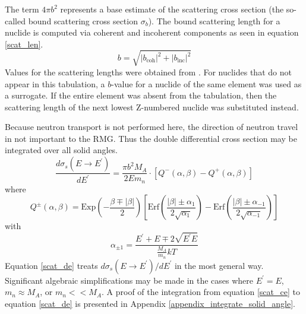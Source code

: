 The term $4 \pi b^2$ represents a base estimate of the scattering cross section
(the so-called bound scattering cross section $\sigma_b$).  
The bound scattering length for a nuclide is computed via coherent and incoherent components
as seen in equation \ref{scat_len}.
\begin{equation}
\label{scat_len}
b = \sqrt{\left| b_{\mbox{coh}} \right|^2 + \left| b_{\mbox{inc}} \right|^2}
\end{equation}
Values for the scattering lengths were obtained from \cite{Sears1992}.  For nuclides
that do not appear in this tabulation, a $b$-value for a nuclide of the same element was
used as a surrogate.  If the entire element was absent from the tabulation, then the 
scattering length of the next lowest Z-numbered nuclide was substituted instead.

Because neutron transport is not performed here, the direction of neutron travel in not
important to the RMG. Thus the double differential cross section may be integrated over all solid angles.
\begin{equation}
\label{scat_de}
\frac{d\sigma_s(E\to E^\prime)}{dE^\prime} = \frac{\pi b^2 M_A}{2Em_n} \cdot 
            \left[Q^-(\alpha, \beta) - Q^+(\alpha, \beta)\right]
\end{equation}
where 
\begin{equation}
\label{scat_q}
Q^\pm(\alpha, \beta) = \mbox{Exp}\left(-\frac{\beta \mp |\beta|}{2}\right) 
                       \left[\mbox{Erf}\left(\frac{|\beta| \pm \alpha_1}{2\sqrt{\alpha_1}}\right) - 
                             \mbox{Erf}\left(\frac{|\beta| \pm \alpha_{-1}}{2\sqrt{\alpha_{-1}}}\right)\right]
\end{equation}
with 
\begin{equation}
\label{scat_alpha_pm}
\alpha_{\pm 1} = \frac{E^\prime + E \mp 2\sqrt{E^\prime E}}{\frac{M_A}{m_n}kT}
\end{equation}
Equation \ref{scat_de} treats $d\sigma_s(E\to E^\prime)/dE^\prime$ in the most general way.  
Significant algebraic simplifications may be made in the cases where $E^\prime = E$, $m_n \approx M_A$, 
or $m_n << M_A$.  A proof of the integration from equation \ref{scat_ce} to equation \ref{scat_de} is 
presented in Appendix \ref{appendix_integrate_solid_angle}.


